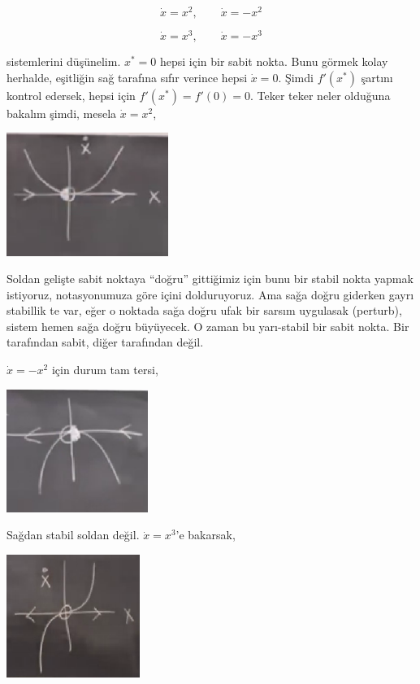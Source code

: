 \documentclass[12pt,fleqn]{article}\usepackage{../../common}
\begin{document}
$$ \dot{x} = x^2, \qquad \dot{x} = -x^2 
$$

$$ \dot{x} = x^3, \qquad \dot{x} = -x^3 
$$

sistemlerini düşünelim. $x^\ast=0$ hepsi için bir sabit nokta. Bunu görmek kolay
herhalde, eşitliğin sağ tarafına sıfır verince hepsi $\dot{x} = 0$. Şimdi
$f'(x^\ast)$ şartını kontrol edersek, hepsi için $f'(x^\ast) = f'(0) = 0$. Teker teker
neler olduğuna bakalım şimdi, mesela $\dot{x} = x^2$, 

\includegraphics[height=4cm]{02_03.png}

Soldan gelişte sabit noktaya ``doğru'' gittiğimiz için bunu bir stabil nokta
yapmak istiyoruz, notasyonumuza göre içini dolduruyoruz. Ama sağa doğru
giderken gayrı stabillik te var, eğer o noktada sağa doğru ufak bir sarsım
uygulasak (perturb), sistem hemen sağa doğru büyüyecek. O zaman bu yarı-stabil
bir sabit nokta. Bir tarafından sabit, diğer tarafından değil.

$\dot{x} = -x^2$ için durum tam tersi,

\includegraphics[height=4cm]{02_04.png}

Sağdan stabil soldan değil. $\dot{x} = x^3$'e bakarsak,

\includegraphics[height=4cm]{02_05.png}
\end{document}
